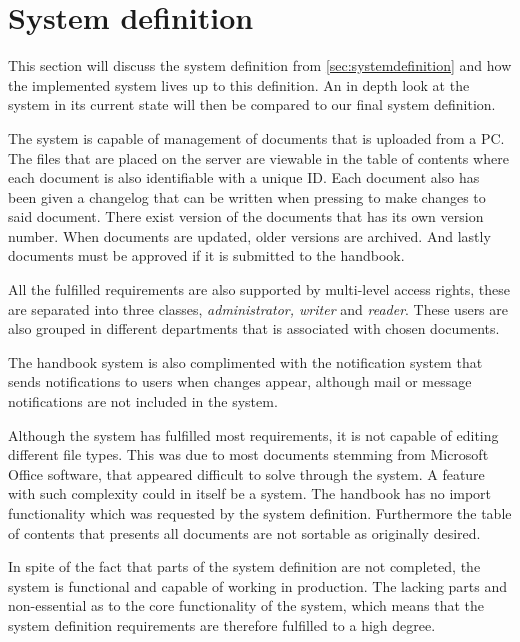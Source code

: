 \section{System definition}\label{sec:dissystemdef}

This section will discuss the system definition from \cref{sec:systemdefinition} and how the implemented system lives up to this definition.
An in depth look at the system in its current state will then be compared to our final system definition.

The system is capable of management of documents that is uploaded from a PC.
The files that are placed on the server are viewable in the table of contents where each document is also identifiable with a unique ID.
Each document also has been given a changelog that can be written when pressing to make changes to said document.
There exist version of the documents that has its own version number.
When documents are updated, older versions are archived.
And lastly documents must be approved if it is submitted to the handbook.

All the fulfilled requirements are also supported by multi-level access rights, these are separated into three classes, \textit{administrator, writer} and \textit{reader}.
These users are also grouped in different departments that is associated with chosen documents.

The handbook system is also complimented with the notification system that sends notifications to users when changes appear, although mail or message notifications are not included in the system.

Although the system has fulfilled most requirements, it is not capable of editing different file types.
This was due to most documents stemming from Microsoft Office software, that appeared difficult to solve through the system.
A feature with such complexity could in itself be a system.
The handbook has no import functionality which was requested by the system definition.
Furthermore the table of contents that presents all documents are not sortable as originally desired.

In spite of the fact that parts of the system definition are not completed, the system is functional and capable of working in production.
The lacking parts and non-essential as to the core functionality of the system, which means that the system definition requirements are therefore fulfilled to a high degree.

